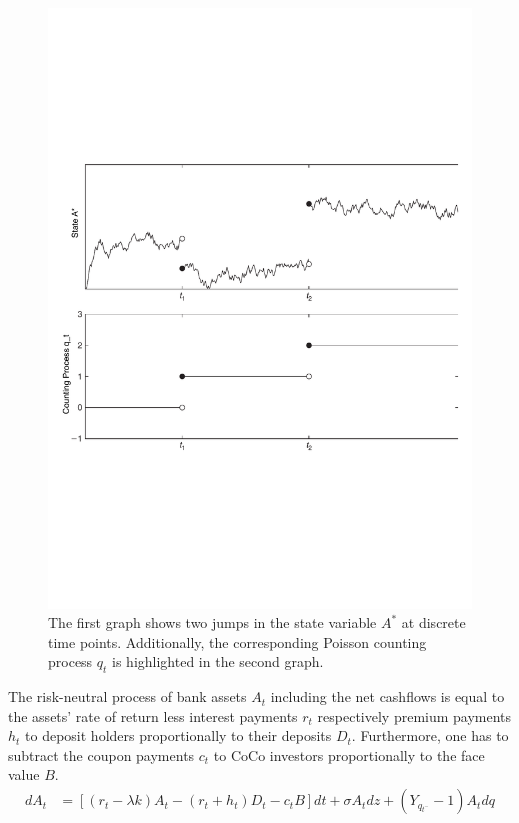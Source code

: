 \begin{figure}[ht]
	\centering
	\includegraphics[trim=0.6cm 7.05cm 0.9cm 9cm, scale = 0.4]{media/jumpprocess} \par
	\caption[Jump-diffusion process]{The first graph shows two jumps in the state variable $A^*$ at discrete time points. Additionally, the corresponding Poisson counting process $q_t$ is highlighted in the second graph. \citep{ait2009handbook}}
	\label{fig:jumpgraph}
\end{figure}

The risk-neutral process of bank assets $A_t$ including the net cashflows is equal to the assets' rate of return less interest payments $r_t$ respectively premium payments $h_t$ to deposit holders proportionally to their deposits $D_t$. Furthermore, one has to subtract the coupon payments $c_t$ to CoCo investors proportionally to the face value $B$.
\begin{align} \label{bankassetprocess2}
dA_t &= \left[ \left( r_t - \lambda k \right) A_t - \left( r_t + h_t \right) D_t - c_t B \right] dt + \sigma A_t dz + \left( Y_{q_{t^{-}}} - 1 \right) A_t dq
\end{align}

